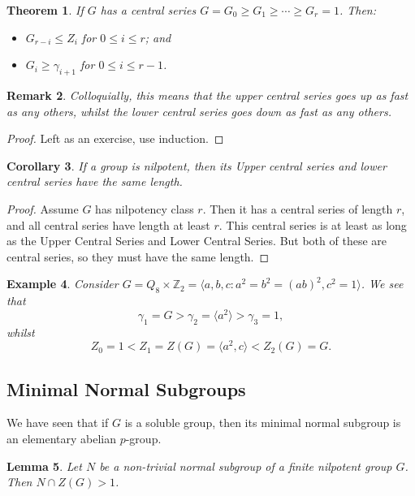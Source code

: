\documentclass[a4paper,10pt]{article}
\newcommand{\ZZ}{\mathbb{Z}}
\newtheorem{thm}{Theorem}
\newtheorem{Cor}[thm]{Corollary}
\newtheorem{eg}[thm]{Example}
\newtheorem{Lem}[thm]{Lemma}
\newtheorem{rem}[thm]{Remark}
\begin{document}
\begin{thm}
If $G$ has a central series $G = G_0 \geq G_1 \geq \cdots \geq G_r = 1$. Then:
\begin{itemize}
\item $G_{r - i} \leq Z_i$ for $0 \leq i \leq r$; and
\item $G_i \geq \gamma_{i + 1}$ for $0 \leq i \leq r-1$. 
\end{itemize}
\end{thm}
\begin{rem}
Colloquially, this means that the upper central series goes up as fast as any others, whilst the lower central series goes down as fast as any others. 
\end{rem}
\begin{proof}
Left as an exercise, use induction.
\end{proof}


\begin{Cor}
If a group is nilpotent, then its Upper central series and lower central series have the same length. 
\end{Cor}

\begin{proof}
Assume $G$ has nilpotency class $r$. Then it has a central series of length $r$, and all central series have length at least $r$. This central series is at least as long as the Upper Central Series and Lower Central Series. But both of these are central series, so they must have the same length. 
\end{proof}


\begin{eg}
Consider $G = Q_8 \times \ZZ_2 = \langle a,b,c : a^2 = b^2 = (ab)^2, c^2 = 1 \rangle$. We see that
\[ \gamma_1 = G > \gamma_2 = \langle a^2 \rangle > \gamma_3 = 1, \]
whilst 
\[ Z_0 = 1 < Z_1 = Z(G) = \langle a^2, c \rangle < Z_2(G) = G. \]
\end{eg}


\subsection{Minimal Normal Subgroups}

We have seen that if $G$ is a soluble group, then its minimal normal subgroup is an elementary abelian $p$-group. 

\begin{Lem}
Let $N$ be a non-trivial normal subgroup of a finite nilpotent group $G$. Then $N \cap Z(G) > 1$. 
\end{Lem}
\end{document}
